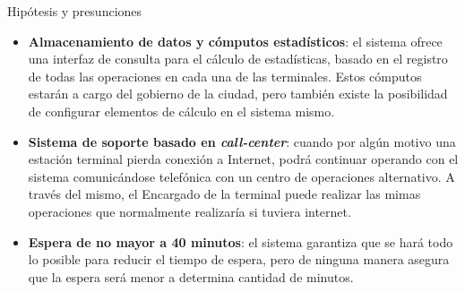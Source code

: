 \begin{subsection}{Hipótesis y presunciones}
\begin{itemize}
\item \textbf{Almacenamiento de datos y cómputos estadísticos}: el sistema ofrece una interfaz de consulta para el cálculo de estadísticas, basado en el registro de todas las operaciones en cada una de las terminales. Estos cómputos estarán a cargo del gobierno de la ciudad, pero también existe la posibilidad de configurar elementos de cálculo en el sistema mismo.

\item \textbf{Sistema de soporte basado en \textit{call-center}}: cuando por algún motivo una estación terminal pierda conexión a Internet, podrá continuar operando con el sistema comunicándose telefónica con un centro de operaciones alternativo. A través del mismo, el Encargado de la terminal puede realizar las mimas operaciones que normalmente realizaría si tuviera internet.

\item \textbf{Espera de no mayor a 40 minutos}: el sistema garantiza que se hará todo lo posible para reducir el tiempo de espera, pero de ninguna manera asegura que la espera será menor a determina cantidad de minutos.

\end{itemize}
\end{subsection}
